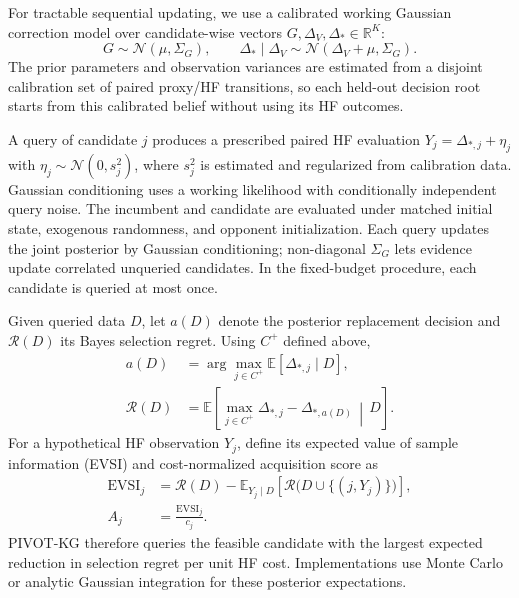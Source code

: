 \documentclass{article}
\newcommand{\E}{\mathbb{E}}
\newcommand{\R}{\mathbb{R}}
\begin{document}
For tractable sequential updating, we use a calibrated working Gaussian correction
model over candidate-wise vectors $G,\Delta_V,\Delta_*\in\R^K$:
\[
  G\sim\mathcal N(\mu,\Sigma_G),
  \qquad
  \Delta_*\mid\Delta_V
  \sim\mathcal N(\Delta_V+\mu,\Sigma_G).
\]
The prior parameters and observation variances are estimated from a disjoint
calibration set of paired proxy/HF transitions, so each held-out decision root
starts from this calibrated belief without using its HF outcomes.

A query of candidate $j$ produces a prescribed paired HF evaluation
$Y_j=\Delta_{*,j}+\eta_j$ with $\eta_j\sim\mathcal N(0,s_j^2)$, where $s_j^2$
is estimated and regularized from calibration data. Gaussian conditioning
uses a working likelihood with conditionally independent query noise.
The incumbent and candidate are evaluated
under matched initial state, exogenous randomness, and opponent initialization.
Each query updates the joint posterior by Gaussian conditioning; non-diagonal
$\Sigma_G$ lets evidence update correlated unqueried candidates. In the
fixed-budget procedure, each candidate is queried at most once.

Given queried data $D$, let $a(D)$ denote the posterior replacement decision
and $\mathcal R(D)$ its Bayes selection regret. Using $C^+$ defined above,
\[
\begin{aligned}
  a(D)
  &=\arg\max_{j\in C^+}\E[\Delta_{*,j}\mid D],\\
  \mathcal R(D)
  &=\E\!\left[
      \max_{j\in C^+}\Delta_{*,j}
      -\Delta_{*,a(D)}
      \,\middle|\,D
    \right].
\end{aligned}
\]
For a hypothetical HF observation $Y_j$, define its expected value of sample
information (EVSI) and cost-normalized acquisition score as
\begin{equation}
\begin{aligned}
  \mathrm{EVSI}_j
  &=\mathcal R(D)
    -\E_{Y_j\mid D}\!\left[\mathcal R\bigl(D\cup\{(j,Y_j)\}\bigr)\right],\\
  A_j&=\frac{\mathrm{EVSI}_j}{c_j}.
\end{aligned}
  \label{eq:acquisition}
\end{equation}
PIVOT-KG therefore queries the feasible candidate with the largest expected
reduction in selection regret per unit HF cost. Implementations use Monte Carlo
or analytic Gaussian integration for these posterior expectations.
\end{document}
